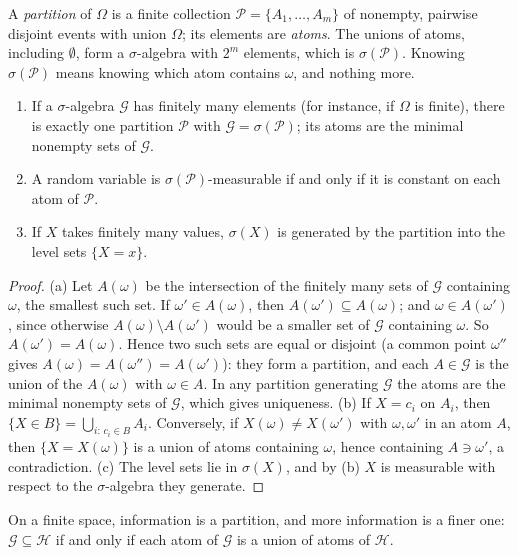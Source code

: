 A \emph{partition} of $\Omega$ is a finite collection $\mathcal P=\{A_1,\dots,A_m\}$ of
nonempty, pairwise disjoint events with union $\Omega$; its elements are \emph{atoms}. The
unions of atoms, including $\emptyset$, form a $\sigma$-algebra with $2^m$ elements, which
is $\sigma(\mathcal P)$. Knowing $\sigma(\mathcal P)$ means knowing which atom contains
$\omega$, and nothing more.

\begin{lemma}\label{lem:pr-partition}
\begin{enumerate}[label=(\alph*)]
  \item If a $\sigma$-algebra $\mathcal G$ has finitely many elements (for instance, if
    $\Omega$ is finite), there is exactly one partition $\mathcal P$ with
    $\mathcal G=\sigma(\mathcal P)$; its atoms are the minimal nonempty sets of $\mathcal G$.
  \item A random variable is $\sigma(\mathcal P)$-measurable if and only if it is constant on
    each atom of $\mathcal P$.
  \item If $X$ takes finitely many values, $\sigma(X)$ is generated by the partition into the
    level sets $\{X=x\}$.
\end{enumerate}
\end{lemma}

\begin{proof}
(a) Let $A(\omega)$ be the intersection of the finitely many sets of $\mathcal G$ containing
$\omega$, the smallest such set. If $\omega'\in A(\omega)$, then
$A(\omega')\subseteq A(\omega)$; and $\omega\in A(\omega')$, since otherwise
$A(\omega)\setminus A(\omega')$ would be a smaller set of $\mathcal G$ containing $\omega$.
So $A(\omega')=A(\omega)$. Hence two such sets are equal or disjoint (a common point
$\omega''$ gives $A(\omega)=A(\omega'')=A(\omega')$): they form a partition, and each
$A\in\mathcal G$ is the union of the $A(\omega)$ with $\omega\in A$. In any partition
generating $\mathcal G$ the atoms are the minimal nonempty sets of $\mathcal G$, which gives
uniqueness. (b) If $X=c_i$ on $A_i$, then $\{X\in B\}=\bigcup_{i:\,c_i\in B}A_i$.
Conversely, if $X(\omega)\ne X(\omega')$ with $\omega,\omega'$ in an atom $A$, then
$\{X=X(\omega)\}$ is a union of atoms containing $\omega$, hence containing $A\ni\omega'$, a
contradiction. (c) The level sets lie in $\sigma(X)$, and by (b) $X$ is measurable with
respect to the $\sigma$-algebra they generate.
\end{proof}

On a finite space, information is a partition, and more information is a finer one:
$\mathcal G\subseteq\mathcal H$ if and only if each atom of $\mathcal G$ is a union of atoms
of $\mathcal H$.

